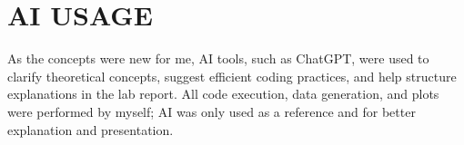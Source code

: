 \newpage
\section*{AI USAGE}

As the concepts were new for me, AI tools, such as ChatGPT, were used to clarify theoretical concepts, suggest efficient coding practices, and help structure explanations in the lab report. All code execution, data generation, and plots were performed by myself; AI was only used as a 
reference and for better explanation and presentation.